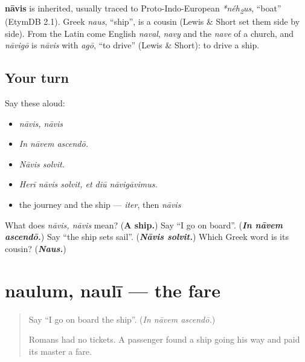 \begin{cousinweb}
\textbf{nāvis} is inherited, usually traced to Proto-Indo-European \emph{*néh\textsubscript{2}us}, \textquotedblleft{}boat\textquotedblright{} (EtymDB 2.1). Greek \emph{naus}, \textquotedblleft{}ship\textquotedblright{}, is a cousin (Lewis \& Short set them side by side). From the Latin come English \emph{naval}, \emph{navy} and the \emph{nave} of a church, and \emph{nāvigō} is \emph{nāvis} with \emph{agō}, \textquotedblleft{}to drive\textquotedblright{} (Lewis \& Short): to drive a ship.
\end{cousinweb}

\subsection*{Your turn}
Say these aloud:

\begin{itemize}
\raggedright
  \item \emph{nāvis, nāvis}
  \item \emph{In nāvem ascendō.}
  \item \emph{Nāvis solvit.}
  \item \emph{Herī nāvis solvit, et diū nāvigāvimus.}
  \item the journey and the ship — \emph{iter}, then \emph{nāvis}
\end{itemize}

\begin{tcolorbox}[breakable,colback=teal!4,colframe=teal!35!black,title={Before you move on}]
What does \emph{nāvis, nāvis} mean? (\textbf{A ship.}) Say \textquotedblleft{}I go on board\textquotedblright{}. (\emph{\textbf{In nāvem ascendō.}}) Say \textquotedblleft{}the ship sets sail\textquotedblright{}. (\emph{\textbf{Nāvis solvit.}}) Which Greek word is its cousin? (\emph{\textbf{Naus.}})
\end{tcolorbox}
\section[naulum, naulī]{naulum, naulī — the fare}

\label{lesson:LA-C286-naulum}



\begin{quote}
Say \textquotedblleft{}I go on board the ship\textquotedblright{}. (\emph{In nāvem ascendō.})

Romans had no tickets. A passenger found a ship going his way and paid its master a fare.
\end{quote}

